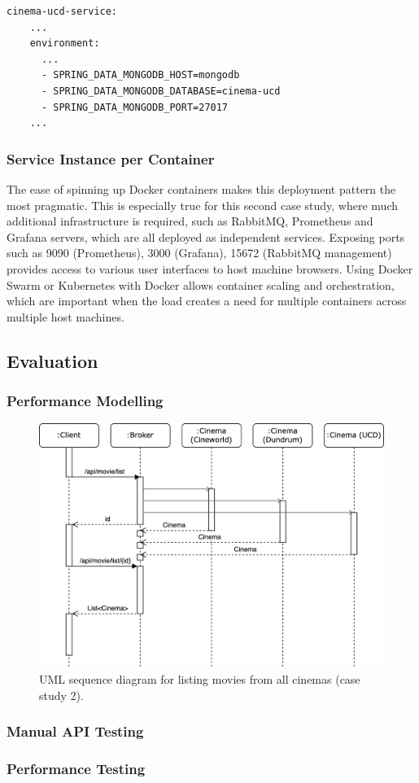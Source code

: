 \begin{lstlisting}[caption=Snippet from \code{docker-compose.yml} for UCD cinema]
  cinema-ucd-service:
    ...
    environment:
      ...
      - SPRING_DATA_MONGODB_HOST=mongodb
      - SPRING_DATA_MONGODB_DATABASE=cinema-ucd
      - SPRING_DATA_MONGODB_PORT=27017
    ...
\end{lstlisting}

\subsubsection{Service Instance per Container}

The ease of spinning up Docker containers makes this deployment pattern the most pragmatic. This is especially true for this second case study, where much additional infrastructure is required, such as RabbitMQ, Prometheus and Grafana servers, which are all deployed as independent services. Exposing ports such as 9090 (Prometheus), 3000 (Grafana), 15672 (RabbitMQ management) provides access to various user interfaces to host machine browsers. Using Docker Swarm or Kubernetes with Docker allows container scaling and orchestration, which are important when the load creates a need for multiple containers across multiple host machines.

\subsection{Evaluation}

\subsubsection{Performance Modelling}

\begin{figure}[H]
	\centering
	\includegraphics[width=0.75\linewidth]{./assets/diagrams/cs02-sequence.png}
	\caption{UML sequence diagram for listing movies from all cinemas (case study 2).}
	\label{fig:cs02-sequence}
\end{figure}

\subsubsection{Manual API Testing}
\subsubsection{Performance Testing}
